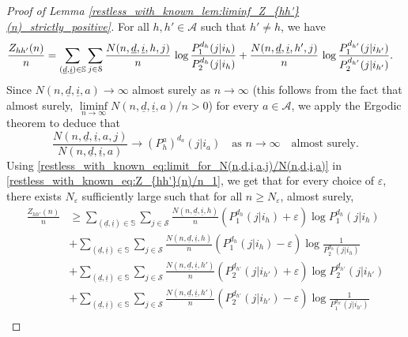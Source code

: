 \begin{proof}[Proof of Lemma \ref{restless_with_known_lem:liminf_Z_{hh'}(n)_strictly_positive}]
For all $h,h'\in \mathcal{A}$ such that $h'\neq h$, we have
\begin{align}
	\frac{Z_{hh'}(n)}{n}&=\sum\limits_{(\underline{d},\underline{i})\in\mathbb{S}}\sum\limits_{j\in \mathcal{S}}\frac{N(n,\underline{d},\underline{i},h,j)}{n}\,\log\frac{P_1^{d_h}(j|i_h)}{P_2^{d_h}(j|i_h)}+\frac{N(n,\underline{d},\underline{i},h',j)}{n}\,\log\frac{P_1^{d_{h'}}(j|i_{h'})}{P_2^{d_{h'}}(j|i_{h'})}.\label{restless_with_known_eq:Z_{hh'}(n)/n_1}
\end{align}
Since $N(n,\underline{d},\underline{i},a)\to\infty$ almost surely as $n\to\infty$ (this follows from the fact that almost surely, \mbox{$\liminf\limits_{n\to\infty}N(n,\underline{d},\underline{i},a)/n>0$}) for every $a\in\mathcal{A}$, we apply the Ergodic theorem to deduce that
\begin{equation}
	\frac{N(n,\underline{d},\underline{i},a,j)}{N(n,\underline{d},\underline{i},a)}\longrightarrow (P_h^a)^{d_a}(j|i_a)\quad \text{as }n\to\infty \quad \text{almost surely}.\label{restless_with_known_eq:limit_for_N(n,d,i,a,j)/N(n,d,i,a)}
\end{equation}
Using \eqref{restless_with_known_eq:limit_for_N(n,d,i,a,j)/N(n,d,i,a)} in \eqref{restless_with_known_eq:Z_{hh'}(n)/n_1}, we get that for every choice of $\varepsilon$, there exists $N_\varepsilon$ sufficiently large such that for all $n\geq N_\varepsilon$, almost surely,
\begin{align}
	\frac{Z_{hh'}(n)}{n}&\geq \sum\limits_{(\underline{d},\underline{i})\in\mathbb{S}}\sum\limits_{j\in \mathcal{S}} \frac{N(n,\underline{d},\underline{i},h)}{n}(P_1^{d_h}(j|i_h)+\varepsilon)\log P_1^{d_h}(j|i_h)\nonumber\\
	&+\sum\limits_{(\underline{d},\underline{i})\in\mathbb{S}}\sum\limits_{j\in \mathcal{S}} \frac{N(n,\underline{d},\underline{i},h)}{n}(P_1^{d_h}(j|i_h)-\varepsilon)\log \frac{1}{P_2^{d_h}(j|i_h)}\nonumber\\
	&+\sum\limits_{(\underline{d},\underline{i})\in\mathbb{S}}\sum\limits_{j\in \mathcal{S}} \frac{N(n,\underline{d},\underline{i},h')}{n}(P_2^{d_{h'}}(j|i_{h'})+\varepsilon)\log P_2^{d_{h'}}(j|i_{h'})\nonumber\\
	&+\sum\limits_{(\underline{d},\underline{i})\in\mathbb{S}}\sum\limits_{j\in \mathcal{S}} \frac{N(n,\underline{d},\underline{i},h')}{n}(P_2^{d_{h'}}(j|i_{h'})-\varepsilon)\log \frac{1}{P_1^{d_{h'}}(j|i_{h'})}\nonumber\\

\end{align}
\end{proof}
